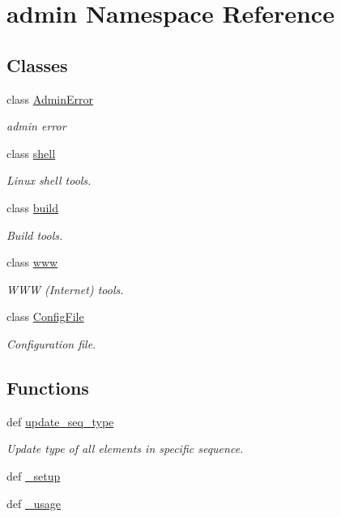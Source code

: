 \hypertarget{namespaceadmin}{\section{admin Namespace Reference}
\label{namespaceadmin}
}
\subsection*{Classes}
\begin{DoxyCompactItemize}
\item 
class \hyperlink{classadmin_1_1AdminError}{Admin\-Error}
\begin{DoxyCompactList}\small\item\em admin error \end{DoxyCompactList}\item 
class \hyperlink{classadmin_1_1shell}{shell}
\begin{DoxyCompactList}\small\item\em Linux shell tools. \end{DoxyCompactList}\item 
class \hyperlink{classadmin_1_1build}{build}
\begin{DoxyCompactList}\small\item\em Build tools. \end{DoxyCompactList}\item 
class \hyperlink{classadmin_1_1www}{www}
\begin{DoxyCompactList}\small\item\em W\-W\-W (Internet) tools. \end{DoxyCompactList}\item 
class \hyperlink{classadmin_1_1ConfigFile}{Config\-File}
\begin{DoxyCompactList}\small\item\em Configuration file. \end{DoxyCompactList}\end{DoxyCompactItemize}
\subsection*{Functions}
\begin{DoxyCompactItemize}
\item 
def \hyperlink{namespaceadmin_ae1dbeff3e935d67ed99b95eb814c9a11}{update\-\_\-seq\-\_\-type}
\begin{DoxyCompactList}\small\item\em Update type of all elements in specific sequence. \end{DoxyCompactList}\item 
def \hyperlink{namespaceadmin_a56bda7fa84a9e893fdeb0d8acd29e89b}{\-\_\-setup}
\item 
def \hyperlink{namespaceadmin_a8edf8d50d5e47a6d8859c560c28ebb36}{\-\_\-usage}
\end{DoxyCompactItemize}
